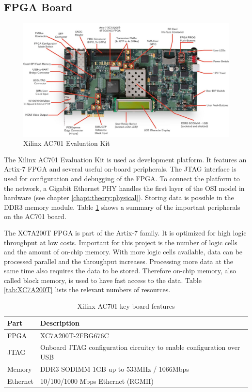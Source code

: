 \subsection{FPGA Board} \label{chapt:mission:fpgaboard}
\begin{figure}[tb!]
    \centering
    \includegraphics[width=\textwidth]{images/mission/ac701.png}
    \caption{Xilinx AC701 Evaluation Kit \cite{image_ac701}}
    \label{fig:ac701}
\end{figure}

The Xilinx AC701 Evaluation Kit is used as development platform. It features an
Artix-7 FPGA and several useful on-board peripherals. The JTAG interface is used
for configuration and debugging of the FPGA. To connect the platform to the
network, a Gigabit Ethernet PHY handles the first layer of the OSI model in
hardware (see chapter \ref{chapt:theory:physical}). Storing data is possible in the DDR3 memory
module. Table \ref{tab:ac701} shows a summary of the important peripherals on
the AC701 board.

The XC7A200T FPGA is part of the Artix-7 family. It is optimized for high logic
throughput at low costs. Important for this project is the number of logic cells
and the amount of on-chip memory. With more logic cells available, data can be
processed parallel and the throughput increases. Processing more data at the
same time also requires the data to be stored. Therefore on-chip memory, also
called block memory, is used to have fast access to the data. Table 
\ref{tab:XC7A200T} lists the relevant numbers of resources.

\begin{table}[h!]
    \centering
    \begin{tabular}{l l}
        \toprule
        Part & Description \\
        \midrule
        FPGA & XC7A200T-2FBG676C \\
        JTAG & Onboard JTAG configuration circuitry to enable configuration over USB \\
        Memory & DDR3 SODIMM 1GB up to 533MHz / 1066Mbps \\
        Ethernet & 10/100/1000 Mbps Ethernet (RGMII) \\
        \bottomrule
    \end{tabular}
    \caption{Xilinx AC701 key board features \cite{xilinx_ac701}}
    \label{tab:ac701}
\end{table}

